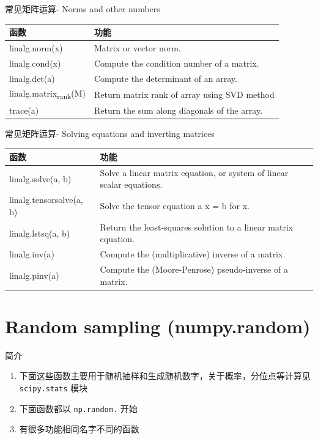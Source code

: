 \documentclass[ignorenonframetext,11pt,xcolor=dvipsnames,hyperref={colorlinks,allcolors=.,urlcolor=blue, citecolor=violet, bookmarksdepth=4},aspectratio=1610]{beamer}
\providecommand{\tightlist}{%
  \setlength{\itemsep}{0pt}\setlength{\parskip}{0pt}}
\newcommand{\passthrough}[1]{#1}
\begin{document}
\begin{frame}{常见矩阵运算- Norms and other numbers}
\protect\hypertarget{norms-and-other-numbers}{}

\scriptsize

\begin{longtable}[]{@{}ll@{}}
\toprule
函数 & 功能\tabularnewline
\midrule
\endhead
linalg.norm(x) & Matrix or vector norm.\tabularnewline
linalg.cond(x) & Compute the condition number of a
matrix.\tabularnewline
linalg.det(a) & Compute the determinant of an array.\tabularnewline
linalg.matrix\textsubscript{rank}(M) & Return matrix rank of array using
SVD method\tabularnewline
trace(a) & Return the sum along diagonals of the array.\tabularnewline
\bottomrule
\end{longtable}

\end{frame}

\begin{frame}{常见矩阵运算- Solving equations and inverting matrices}
\protect\hypertarget{solving-equations-and-inverting-matrices}{}

\scriptsize

\begin{longtable}[]{@{}ll@{}}
\toprule
函数 & 功能\tabularnewline
\midrule
\endhead
linalg.solve(a, b) & Solve a linear matrix equation, or system of linear
scalar equations.\tabularnewline
linalg.tensorsolve(a, b) & Solve the tensor equation a x = b for
x.\tabularnewline
linalg.lstsq(a, b) & Return the least-squares solution to a linear
matrix equation.\tabularnewline
linalg.inv(a) & Compute the (multiplicative) inverse of a
matrix.\tabularnewline
linalg.pinv(a) & Compute the (Moore-Penrose) pseudo-inverse of a
matrix.\tabularnewline
\bottomrule
\end{longtable}

\end{frame}

\hypertarget{random-sampling-numpy.random}{%
\section{Random sampling
(numpy.random)}\label{random-sampling-numpy.random}}

\begin{frame}[fragile]{简介}
\protect\hypertarget{section-4}{}

\begin{enumerate}
\tightlist
\item
  下面这些函数主要用于随机抽样和生成随机数字，关于概率，分位点等计算见
  \passthrough{\lstinline!scipy.stats!} 模块
\item
  下面函数都以 \passthrough{\lstinline!np.random.!} 开始
\item
  有很多功能相同名字不同的函数
\end{enumerate}

\end{frame}
\end{document}
